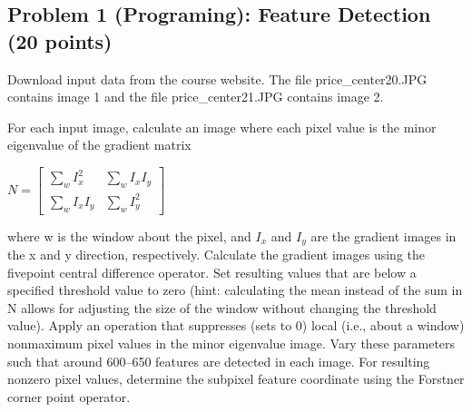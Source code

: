 \documentclass[11pt]{article}
\begin{document}
    \subsection{Problem 1 (Programing): Feature Detection (20
points)}\label{problem-1-programing-feature-detection-20-points}

Download input data from the course website. The file
price\_center20.JPG contains image 1 and the file price\_center21.JPG
contains image 2.

For each input image, calculate an image where each pixel value is the
minor eigenvalue of the gradient matrix

\(N=\left[ \begin{array}{cc} \sum\limits_w I_x^2 & \sum\limits_w I_x I_y\\ \sum\limits_w I_x I_y & \sum\limits_w I_y^2 \end{array} \right]\)

where w is the window about the pixel, and \(I_x\) and \(I_y\) are the
gradient images in the x and y direction, respectively. Calculate the
gradient images using the fivepoint central difference operator. Set
resulting values that are below a specified threshold value to zero
(hint: calculating the mean instead of the sum in N allows for adjusting
the size of the window without changing the threshold value). Apply an
operation that suppresses (sets to 0) local (i.e., about a window)
nonmaximum pixel values in the minor eigenvalue image. Vary these
parameters such that around 600--650 features are detected in each
image. For resulting nonzero pixel values, determine the subpixel
feature coordinate using the Forstner corner point operator.
\end{document}
